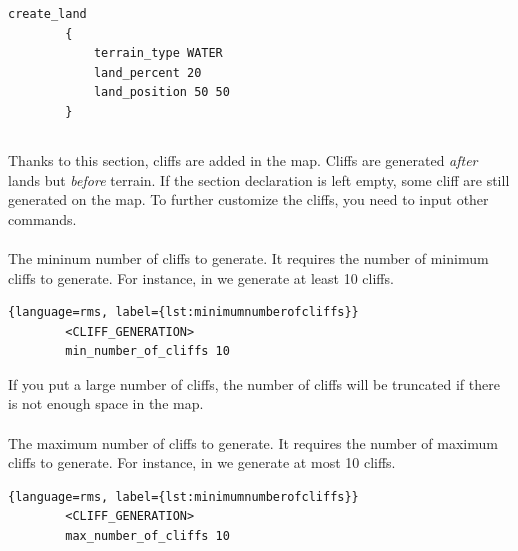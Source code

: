 \begin{appendices}
    \begin{lstlisting}[language=rms,label={lst:create-land},caption={Example of usage of \term{create\_land} in Team Arean by vierklee.}]
        create_land
        { 
            terrain_type WATER
            land_percent 20
            land_position 50 50
        }
    \end{lstlisting}

    \subsection{}

    Thanks to this section, cliffs are added in the map\cite{aok:cliffs, zetnus:2015}.
    Cliffs are generated \textit{after} lands but \textit{before} terrain. If the section declaration is left empty, some cliff are still generated on the map.
    To further customize the cliffs, you need to input other commands.

    \paragraph{}

    The mininum number of cliffs to generate. It requires the number of minimum cliffs to generate. For instance, in  we generate at least 10 cliffs.

    \begin{lstlisting}{language=rms, label={lst:minimumnumberofcliffs}}
        <CLIFF_GENERATION>
        min_number_of_cliffs 10
    \end{lstlisting}

    \begin{warning}
        If you put a large number of cliffs, the number of cliffs will be truncated if there is not enough space in the map.
    \end{warning}

    \paragraph{}

    The maximum number of cliffs to generate. It requires the number of maximum cliffs to generate. For instance, in  we generate at most 10 cliffs.

    \begin{lstlisting}{language=rms, label={lst:minimumnumberofcliffs}}
        <CLIFF_GENERATION>
        max_number_of_cliffs 10
    \end{lstlisting}


\end{appendices}
